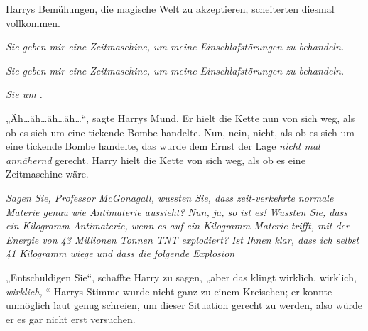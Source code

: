 Harrys Bemühungen, die magische Welt zu akzeptieren, scheiterten diesmal vollkommen.

\emph{Sie geben mir eine Zeitmaschine, um meine Einschlafstörungen zu behandeln.}

\emph{Sie geben mir eine \emph{Zeitmaschine}, um meine \emph{Einschlafstörungen} zu behandeln.}

\emph{Sie  um .}

„Äh…äh…äh…äh…“, sagte Harrys Mund. Er hielt die Kette nun von sich weg, als ob es sich um eine tickende Bombe handelte. Nun, nein, nicht, als ob es sich um eine tickende Bombe handelte, das wurde dem Ernst der Lage \emph{nicht mal annähernd} gerecht. Harry hielt die Kette von sich weg, als ob es eine Zeitmaschine wäre.

\emph{Sagen Sie, Professor McGonagall, wussten Sie, dass zeit-verkehrte normale Materie genau wie Antimaterie aussieht? Nun, ja, so ist es! Wussten Sie, dass ein Kilogramm Antimaterie, wenn es auf ein Kilogramm Materie trifft, mit der Energie von 43 Millionen Tonnen TNT explodiert? Ist Ihnen klar, dass ich selbst 41 Kilogramm wiege und dass die folgende Explosion }

„Entschuldigen Sie“, schaffte Harry zu sagen, „aber das klingt wirklich, wirklich, \emph{wirklich, }“ Harrys Stimme wurde nicht ganz zu einem Kreischen; er konnte unmöglich laut genug schreien, um dieser Situation gerecht zu werden, also würde er es gar nicht erst versuchen.

